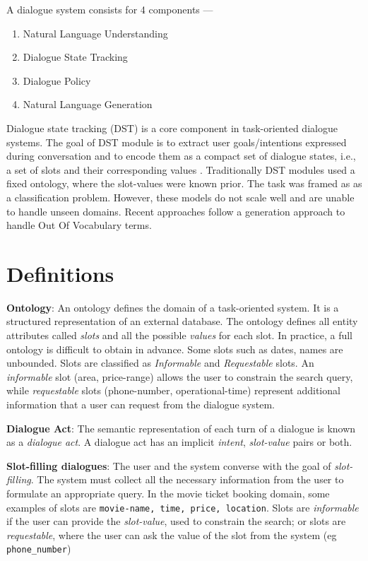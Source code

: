 \documentclass[12pt,a4paper]{article}
\begin{document}
A dialogue system consists for 4 components ---

\begin{enumerate}
  \setlength\itemsep{0pt}
  \item Natural Language Understanding
  \item Dialogue State Tracking
  \item Dialogue Policy
  \item Natural Language Generation
\end{enumerate}

Dialogue state tracking (DST) is a core component in task-oriented dialogue systems. The goal of DST module is to extract user goals/intentions expressed during conversation and to encode them as a compact set of dialogue states, i.e., a set of slots and their corresponding values \cite{WuTradeDST2019}. Traditionally DST modules used a fixed ontology, where the slot-values were known prior. The task was framed as as a classification problem. However, these models do not scale well and are unable to handle unseen domains. Recent approaches follow a generation approach to handle Out Of Vocabulary terms.

\section{Definitions}

\textbf{Ontology}: An ontology defines the domain of a task-oriented system. It is a structured representation of an external database. The ontology defines all entity attributes called \textit{slots} and all the possible \textit{values} for each slot. In practice, a full ontology is difficult to obtain in advance. Some slots such as dates, names are unbounded. Slots are classified as \textit{Informable} and \textit{Requestable} slots. An \textit{informable} slot (area, price-range) allows the user to constrain the search query, while \textit{requestable} slots (phone-number, operational-time) represent additional information that a user can request from the dialogue system.

\medskip \noindent \textbf{Dialogue Act}: The semantic representation of each turn of a dialogue is known as a \textit{dialogue act}. A dialogue act has an implicit \textit{intent}, \textit{slot-value} pairs or both.

\medskip \noindent \textbf{Slot-filling dialogues}: The user and the system converse with the goal of \textit{slot-filling}. The system must collect all the necessary information from the user to formulate an appropriate query. In the movie ticket booking domain, some examples of slots are \texttt{movie-name, time, price, location}. Slots are \textit{informable} if the user can provide the \textit{slot-value}, used to constrain the search; or slots are \textit{requestable}, where the user can ask the value of the slot from the system (eg \texttt{phone\_number})
\end{document}
